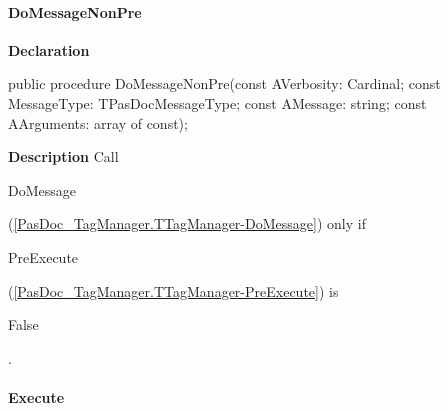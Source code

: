 \documentclass{report}
\newif\ifpdf
\begin{document}
\paragraph*{DoMessageNonPre}\hspace*{\fill}

\label{PasDoc_TagManager.TTagManager-DoMessageNonPre}
\begin{list}{}{
\setlength{\itemindent}{0cm}
\setlength{\listparindent}{0cm}
\setlength{\leftmargin}{\evensidemargin}
\addtolength{\leftmargin}{\tmplength}
\settowidth{\labelsep}{X}
\addtolength{\leftmargin}{\labelsep}
\setlength{\labelwidth}{\tmplength}
}
\item[\textbf{Declaration}\hfill]
\ifpdf
\begin{flushleft}
\fi
\begin{ttfamily}
public procedure DoMessageNonPre(const AVerbosity: Cardinal; const MessageType: TPasDocMessageType; const AMessage: string; const AArguments: array of const);\end{ttfamily}

\ifpdf
\end{flushleft}
\fi

\par
\item[\textbf{Description}]
Call \begin{ttfamily}DoMessage\end{ttfamily}(\ref{PasDoc_TagManager.TTagManager-DoMessage}) only if \begin{ttfamily}PreExecute\end{ttfamily}(\ref{PasDoc_TagManager.TTagManager-PreExecute}) is \begin{ttfamily}False\end{ttfamily}.

\end{list}
\paragraph*{Execute}\hspace*{\fill}
\end{document}
